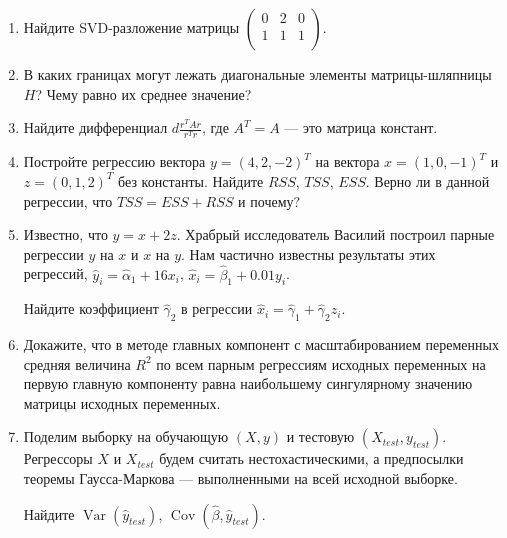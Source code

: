 \documentclass[12pt]{article} %
\theoremstyle{definition} %
\DeclareMathOperator{\Cov}{Cov}
\DeclareMathOperator{\Var}{Var}
\begin{document}
\begin{enumerate}
  \item Найдите SVD-разложение матрицы
  $\begin{pmatrix}
   0 & 2 & 0 \\
   1 & 1 & 1 \\
  \end{pmatrix}$.
  \item В каких границах могут лежать диагональные элементы матрицы-шляпницы $H$?
  Чему равно их среднее значение?
  \item Найдите дифференциал $d \frac{r^T Ar}{r^Tr}$, где $A^T=A$ — это матрица констант.
  \item Постройте регрессию вектора $y = (4,2,-2)^T$ на вектора $x=(1,0,-1)^T$ и $z=(0,1,2)^T$
  без константы. Найдите $RSS$, $TSS$, $ESS$. Верно ли в данной регрессии, что $TSS=ESS+RSS$ и почему?
  \item Известно, что $y=x+2z$. Храбрый исследователь Василий построил парные регрессии
  $y$ на $x$ и $x$ на $y$. Нам частично известны результаты этих регрессий, $\hat y_i = \hat\alpha_1 + 16 x_i$,
  $\hat x_i = \hat \beta_1 + 0.01 y_i$.

  Найдите коэффициент $\hat\gamma_2$ в регрессии $\hat x_i = \hat \gamma_1 + \hat\gamma_2 z_i$.
  \item Докажите, что в методе главных компонент с масштабированием переменных средняя величина $R^2$ по всем парным
  регрессиям исходных переменных на первую главную компоненту равна наибольшему сингулярному значению
  матрицы исходных переменных.

  \item Поделим выборку на обучающую $(X, y)$ и тестовую $(X_{test}, y_{test})$.
  Регрессоры $X$ и $X_{test}$ будем считать нестохастическими, а предпосылки
  теоремы Гаусса-Маркова — выполненными на всей исходной выборке.

  Найдите $\Var(\hat y_{test})$, $\Cov(\hat \beta, \hat y_{test})$.
\end{enumerate}
\end{document}

